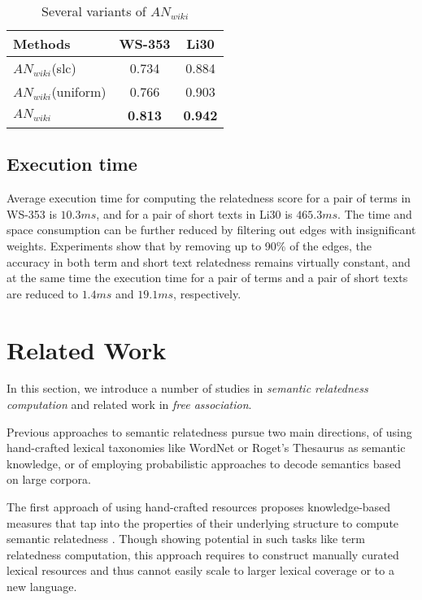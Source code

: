 \documentclass[letterpaper]{article}
\begin{document}
\begin{table}[ht]
\centering
\caption{Several variants of $AN_{wiki}$}
\begin{tabular}{lcc}
\hline
Methods & WS-353 & Li30\\
\hline
$AN_{wiki}$(slc) & 0.734 & 0.884\\
$AN_{wiki}$(uniform) & 0.766 & 0.903\\
$AN_{wiki}$ & {\bf0.813} & {\bf0.942}\\
\hline
\end{tabular}
\label{tab:comparison1}
\end{table}

\subsection{Execution time}
\label{sec:time}
Average execution time for computing the relatedness score for a pair of
terms in WS-353 is $10.3ms$, and for a pair of short texts in Li30 is $465.3ms$.
The time and space consumption can be further reduced
by filtering out edges with insignificant weights. Experiments show that
by removing up to 90\% of the edges, the accuracy in both term and short text
relatedness remains virtually constant,
and at the same time the execution time for a pair of terms and a pair 
of short texts are reduced to $1.4ms$ and $19.1ms$, respectively.

\section{Related Work}
\label{sec:related}

In this section, we introduce a number of studies
in {\em semantic relatedness computation}
and related work in {\em free association}.

Previous approaches to semantic relatedness pursue two main
directions, of using hand-crafted lexical taxonomies like
WordNet \cite{Miller1995} or Roget's Thesaurus \cite{Roget} as
semantic knowledge, or of employing probabilistic approaches to
decode semantics based on large corpora.

The first approach of using hand-crafted resources proposes
knowledge-based measures that tap into the properties of their underlying
structure to compute semantic relatedness
 \cite{Roget,Lin:1998,leacock1998,Hirst:1998,Jiang:1997,Resnik:1995,wu1994verbs}.
Though showing potential in such tasks like term relatedness
computation, this approach requires to construct manually curated lexical
resources and thus cannot easily scale to larger lexical coverage or
to a new language.
\end{document}
